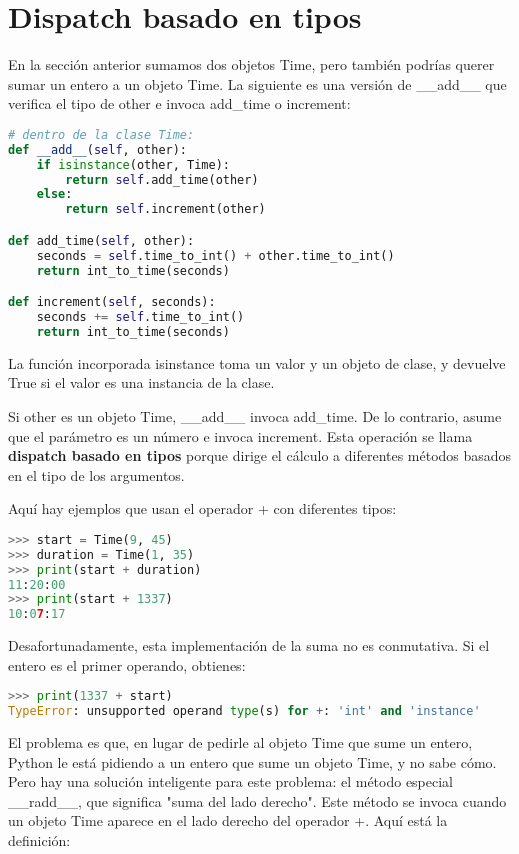\section{Dispatch basado en tipos}

En la sección anterior sumamos dos objetos Time, pero también podrías querer sumar un entero a un objeto Time. La siguiente es una versión de \_\_add\_\_ que verifica el tipo de other e invoca add\_time o increment:

\begin{lstlisting}[language=Python]
# dentro de la clase Time:
def __add__(self, other):
    if isinstance(other, Time):
        return self.add_time(other)
    else:
        return self.increment(other)

def add_time(self, other):
    seconds = self.time_to_int() + other.time_to_int()
    return int_to_time(seconds)

def increment(self, seconds):
    seconds += self.time_to_int()
    return int_to_time(seconds)
\end{lstlisting}

La función incorporada isinstance toma un valor y un objeto de clase, y devuelve True si el valor es una instancia de la clase.

Si other es un objeto Time, \_\_add\_\_ invoca add\_time. De lo contrario, asume que el parámetro es un número e invoca increment. Esta operación se llama \textbf{dispatch basado en tipos} porque dirige el cálculo a diferentes métodos basados en el tipo de los argumentos.

Aquí hay ejemplos que usan el operador + con diferentes tipos:

\begin{lstlisting}[language=Python]
>>> start = Time(9, 45)
>>> duration = Time(1, 35)
>>> print(start + duration)
11:20:00
>>> print(start + 1337)
10:07:17
\end{lstlisting}

Desafortunadamente, esta implementación de la suma no es conmutativa. Si el entero es el primer operando, obtienes:

\begin{lstlisting}[language=Python]
>>> print(1337 + start)
TypeError: unsupported operand type(s) for +: 'int' and 'instance'
\end{lstlisting}

El problema es que, en lugar de pedirle al objeto Time que sume un entero, Python le está pidiendo a un entero que sume un objeto Time, y no sabe cómo. Pero hay una solución inteligente para este problema: el método especial \_\_radd\_\_, que significa "suma del lado derecho". Este método se invoca cuando un objeto Time aparece en el lado derecho del operador +. Aquí está la definición:

